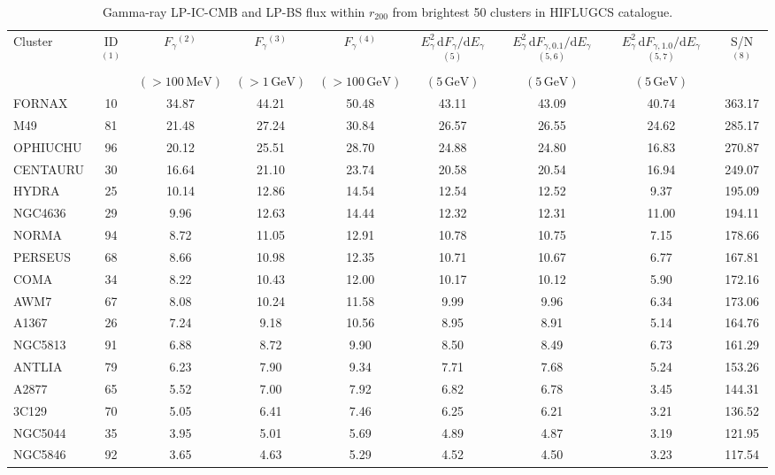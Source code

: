 \documentclass[10pt,aps,pra,reprint,amsmath,amsfonts,amssymb,showpacs,nofootinbib,floatfix]{revtex4-1}
\newcommand{\rmn}{\mathrm}
\newcommand{\dd}{\rmn{d}}
\newcommand{\rvir}{r_{200}}
\newcommand{\eg}{E_\gamma}
\begin{document}
\begin{table}
\begin{minipage}{2.0\columnwidth}
  \caption{Gamma-ray LP-IC-CMB and LP-BS flux within $\rvir$ from brightest 50 clusters in HIFLUGCS catalogue.}
\begin{tabular}{l c c c c c c c c}
\hline
\hline
 Cluster & ID$^{(1)}$ & $F_{\gamma}$$^{(2)}$ & $F_{\gamma}$$^{(3)}$&
 $F_{\gamma}$$^{(4)}$ & $\eg^2\,\dd F_{\gamma}/\dd \eg$$^{(5)}$ &
 $\eg^2\,\dd F_{\gamma,0.1}/\dd \eg$$^{(5,6)}$ &
 $\eg^2\,\dd F_{\gamma,1.0}/\dd \eg$$^{(5,7)}$ & S/N$^{(8)}$ \\
  & & $(>100\,\rmn{MeV})$ & $(>1\,\rmn{GeV})$ & $(>100\,\rmn{GeV})$ &
 $(5\,\rmn{GeV})$ & $(5\,\rmn{GeV})$ & $(5\,\rmn{GeV})$ & \\
 \hline
FORNAX & 10 & 34.87 & 44.21 & 50.48 & 43.11 & 43.09 & 40.74 & 363.17 \\
M49 & 81 & 21.48 & 27.24 & 30.84 & 26.57 & 26.55 & 24.62 & 285.17 \\
OPHIUCHU & 96 & 20.12 & 25.51 & 28.70 & 24.88 & 24.80 & 16.83 & 270.87 \\
CENTAURU & 30 & 16.64 & 21.10 & 23.74 & 20.58 & 20.54 & 16.94 & 249.07 \\
HYDRA & 25 & 10.14 & 12.86 & 14.54 & 12.54 & 12.52 & 9.37 & 195.09 \\
NGC4636 & 29 & 9.96 & 12.63 & 14.44 & 12.32 & 12.31 & 11.00 & 194.11 \\
NORMA & 94 & 8.72 & 11.05 & 12.91 & 10.78 & 10.75 & 7.15 & 178.66 \\
PERSEUS & 68 & 8.66 & 10.98 & 12.35 & 10.71 & 10.67 & 6.77 & 167.81 \\
COMA & 34 & 8.22 & 10.43 & 12.00 & 10.17 & 10.12 & 5.90 & 172.16 \\
AWM7 & 67 & 8.08 & 10.24 & 11.58 & 9.99 & 9.96 & 6.34 & 173.06 \\
A1367 & 26 & 7.24 & 9.18 & 10.56 & 8.95 & 8.91 & 5.14 & 164.76 \\
NGC5813 & 91 & 6.88 & 8.72 & 9.90 & 8.50 & 8.49 & 6.73 & 161.29 \\
ANTLIA & 79 & 6.23 & 7.90 & 9.34 & 7.71 & 7.68 & 5.24 & 153.26 \\
A2877 & 65 & 5.52 & 7.00 & 7.92 & 6.82 & 6.78 & 3.45 & 144.31 \\
3C129 & 70 & 5.05 & 6.41 & 7.46 & 6.25 & 6.21 & 3.21 & 136.52 \\
NGC5044 & 35 & 3.95 & 5.01 & 5.69 & 4.89 & 4.87 & 3.19 & 121.95 \\
NGC5846 & 92 & 3.65 & 4.63 & 5.29 & 4.52 & 4.50 & 3.23 & 117.54 \\

\end{tabular}
\end{minipage}
\end{table}
\end{document}
